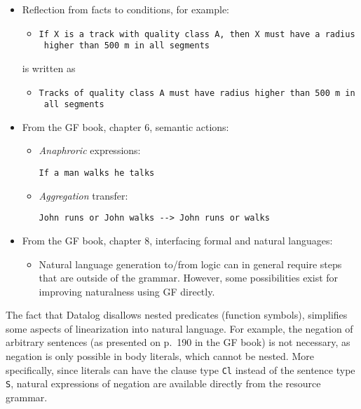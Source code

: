 \documentclass[]{article}
\providecommand{\tightlist}{%
  \setlength{\itemsep}{0pt}\setlength{\parskip}{0pt}}
\begin{document}
\begin{itemize}
\item
  Reflection from facts to conditions, for example:

  \begin{itemize}
  \tightlist
  \item
    \texttt{If\ X\ is\ a\ track\ with\ quality\ class\ A,\ then\ X\ must\ have\ a\ radius\ higher\ than\ 500\ m\ in\ all\ segments}
  \end{itemize}

  is written as

  \begin{itemize}
  \tightlist
  \item
    \texttt{Tracks\ of\ quality\ class\ A\ must\ have\ radius\ higher\ than\ 500\ m\ in\ all\ segments}
  \end{itemize}
\item
  From the GF book, chapter 6, semantic actions:

  \begin{itemize}
  \item
    \emph{Anaphroric} expressions:

\begin{verbatim}
If a man walks he talks
\end{verbatim}
  \item
    \emph{Aggregation} transfer:

\begin{verbatim}
John runs or John walks --> John runs or walks
\end{verbatim}
  \end{itemize}
\item
  From the GF book, chapter 8, interfacing formal and natural languages:

  \begin{itemize}
  \tightlist
  \item
    Natural language generation to/from logic can in general require
    steps that are outside of the grammar. However, some possibilities
    exist for improving naturalness using GF directly.
  \end{itemize}
\end{itemize}

The fact that Datalog disallows nested predicates (function symbols),
simplifies some aspects of linearization into natural language. For
example, the negation of arbitrary sentences (as presented on p.~190 in
the GF book) is not necessary, as negation is only possible in body
literals, which cannot be nested. More specifically, since literals can
have the clause type \texttt{Cl} instead of the sentence type
\texttt{S}, natural expressions of negation are available directly from
the resource grammar.
\end{document}
